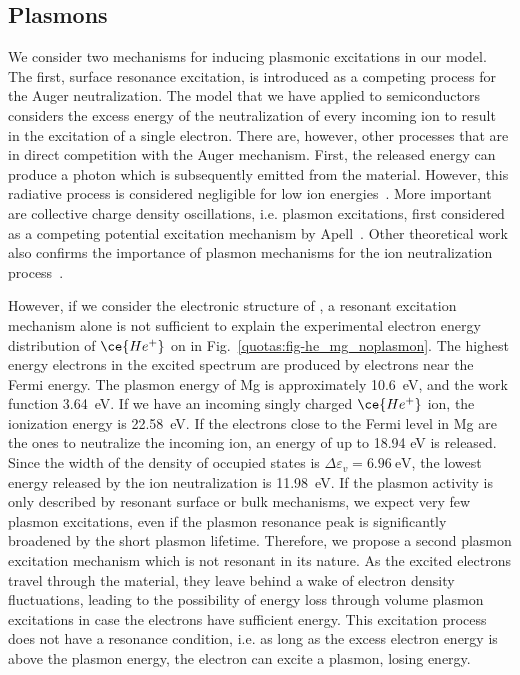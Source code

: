 \begin{refsection}
\subsection{Plasmons} \label{quotas:sec-plasmons}

We consider two mechanisms for inducing plasmonic excitations in our model. The first, surface resonance excitation, is introduced as a competing process for the Auger neutralization. The model that we have applied to semiconductors considers the excess energy of the neutralization of every incoming ion to result in the excitation of a single electron. There are, however, other processes that are in direct competition with the Auger mechanism. First, the released energy can produce a photon which is subsequently emitted from the material. However, this radiative process is considered negligible for low ion energies~\cite{Almulhem1989}. More important are collective charge density oscillations, i.e. plasmon excitations, first considered as a competing potential excitation mechanism by Apell~\cite{Apell1988}. Other theoretical work also confirms the importance of plasmon mechanisms for the ion neutralization process~\cite{Almulhem1989, Monreal1995, VicenteAlvarez1998}. 

However, if we consider the electronic structure of , a resonant excitation mechanism alone is not sufficient to explain the experimental electron energy distribution of $\ce{He^+}$ on  in Fig.~\ref{quotas:fig-he_mg_noplasmon}. The highest energy electrons in the excited spectrum are produced by electrons near the Fermi energy. The plasmon energy of Mg is approximately 10.6~\si{\electronvolt}, and the work function 3.64~\si{\electronvolt}. If we have an incoming singly charged $\ce{He^+}$ ion, the ionization energy is 22.58~\si{\electronvolt}. If the electrons close to the Fermi level in Mg are the ones to neutralize the incoming ion, an energy of up to 18.94 eV is released. Since the width of the density of occupied states is $\Delta \varepsilon_{v} = 6.96~\si{\electronvolt}$, the lowest energy released by the ion neutralization is 11.98~\si{\electronvolt}. If the plasmon activity is only described by resonant surface or bulk mechanisms, we expect very few plasmon excitations, even if the plasmon resonance peak is significantly broadened by the short plasmon lifetime. Therefore, we propose a second plasmon excitation mechanism which is not resonant in its nature. As the excited electrons travel through the material, they leave behind a wake of electron density fluctuations, leading to the possibility of energy loss through volume plasmon excitations in case the electrons have sufficient energy. This excitation process does not have a resonance condition, i.e. as long as the excess electron energy is above the plasmon energy, the electron can excite a plasmon, losing energy. 


\end{refsection}
